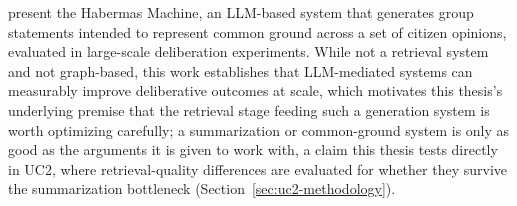 \textcite{tessler2024science} present the Habermas Machine, an LLM-based system that generates
group statements intended to represent common ground across a set of citizen opinions, evaluated
in large-scale deliberation experiments. While not a retrieval system and not graph-based, this
work establishes that LLM-mediated systems can measurably improve deliberative outcomes at scale,
which motivates this thesis's underlying premise that the retrieval stage feeding such a
generation system is worth optimizing carefully; a summarization or common-ground system is only
as good as the arguments it is given to work with, a claim this thesis tests directly in UC2,
where retrieval-quality differences are evaluated for whether they survive the summarization
bottleneck (Section~\ref{sec:uc2-methodology}).